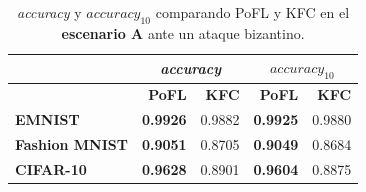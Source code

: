 \begin{table}[h!]
\centering
\begin{tabular}{lrrrr}
\toprule
 & \multicolumn{2}{c}{\textit{accuracy}} & \multicolumn{2}{c}{\textit{$accuracy_{10}$}}   \\
 \toprule
\textbf{}     & \textbf{PoFL}    & \textbf{KFC} & \textbf{PoFL}    & \textbf{KFC} \\ 
\midrule
\textbf{EMNIST}        &   \textbf{0.9926}&  0.9882& \textbf{0.9925}& 0.9880\\ 
\midrule
\textbf{Fashion MNIST}&    \textbf{0.9051}& 0.8705&  \textbf{0.9049}&   0.8684\\ 
\midrule
\textbf{CIFAR-10}      & \textbf{0.9628}& 0.8901& \textbf{0.9604}& 0.8875\\
\bottomrule
\end{tabular}
    \caption{\textit{accuracy} y \textit{$accuracy_{10}$} comparando PoFL y KFC en el \textbf{escenario A} ante un ataque bizantino.}  \label{tab:kfcbyzantine_a}

\end{table}


